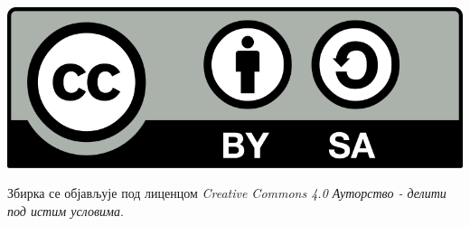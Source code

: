 \vfill

\noindent
\begin{minipage}{0.2\textwidth}
    \includegraphics[width=\textwidth]{CC_BY-SA.png} 
\end{minipage}
\hfill
\begin{minipage}{0.75\textwidth}
    Збирка се објављује под лиценцом 
    \textit{Creative Commons 4.0 Ауторство - делити под истим условима}.
\end{minipage}
    